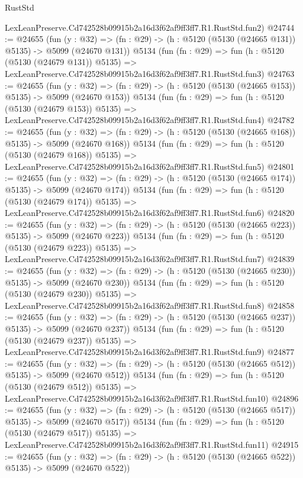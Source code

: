 \begin{lexlean}{RustStd}
\begin{coremodule}
    LexLeanPreserve.Cd742528b09915b2a16d3f62af9ff3ff7.R1.RustStd.fun2)
@24744 := @24655
    (fun (y : @32) => (fn : @29) -> (h : @5120 (@5130 (@24665 @131)) @5135) -> @5099 (@24670 @131))
    @5134
    (fun (fn : @29) =>
    fun (h : @5120 (@5130 (@24679 @131)) @5135) =>
    LexLeanPreserve.Cd742528b09915b2a16d3f62af9ff3ff7.R1.RustStd.fun3)
@24763 := @24655
    (fun (y : @32) => (fn : @29) -> (h : @5120 (@5130 (@24665 @153)) @5135) -> @5099 (@24670 @153))
    @5134
    (fun (fn : @29) =>
    fun (h : @5120 (@5130 (@24679 @153)) @5135) =>
    LexLeanPreserve.Cd742528b09915b2a16d3f62af9ff3ff7.R1.RustStd.fun4)
@24782 := @24655
    (fun (y : @32) => (fn : @29) -> (h : @5120 (@5130 (@24665 @168)) @5135) -> @5099 (@24670 @168))
    @5134
    (fun (fn : @29) =>
    fun (h : @5120 (@5130 (@24679 @168)) @5135) =>
    LexLeanPreserve.Cd742528b09915b2a16d3f62af9ff3ff7.R1.RustStd.fun5)
@24801 := @24655
    (fun (y : @32) => (fn : @29) -> (h : @5120 (@5130 (@24665 @174)) @5135) -> @5099 (@24670 @174))
    @5134
    (fun (fn : @29) =>
    fun (h : @5120 (@5130 (@24679 @174)) @5135) =>
    LexLeanPreserve.Cd742528b09915b2a16d3f62af9ff3ff7.R1.RustStd.fun6)
@24820 := @24655
    (fun (y : @32) => (fn : @29) -> (h : @5120 (@5130 (@24665 @223)) @5135) -> @5099 (@24670 @223))
    @5134
    (fun (fn : @29) =>
    fun (h : @5120 (@5130 (@24679 @223)) @5135) =>
    LexLeanPreserve.Cd742528b09915b2a16d3f62af9ff3ff7.R1.RustStd.fun7)
@24839 := @24655
    (fun (y : @32) => (fn : @29) -> (h : @5120 (@5130 (@24665 @230)) @5135) -> @5099 (@24670 @230))
    @5134
    (fun (fn : @29) =>
    fun (h : @5120 (@5130 (@24679 @230)) @5135) =>
    LexLeanPreserve.Cd742528b09915b2a16d3f62af9ff3ff7.R1.RustStd.fun8)
@24858 := @24655
    (fun (y : @32) => (fn : @29) -> (h : @5120 (@5130 (@24665 @237)) @5135) -> @5099 (@24670 @237))
    @5134
    (fun (fn : @29) =>
    fun (h : @5120 (@5130 (@24679 @237)) @5135) =>
    LexLeanPreserve.Cd742528b09915b2a16d3f62af9ff3ff7.R1.RustStd.fun9)
@24877 := @24655
    (fun (y : @32) => (fn : @29) -> (h : @5120 (@5130 (@24665 @512)) @5135) -> @5099 (@24670 @512))
    @5134
    (fun (fn : @29) =>
    fun (h : @5120 (@5130 (@24679 @512)) @5135) =>
    LexLeanPreserve.Cd742528b09915b2a16d3f62af9ff3ff7.R1.RustStd.fun10)
@24896 := @24655
    (fun (y : @32) => (fn : @29) -> (h : @5120 (@5130 (@24665 @517)) @5135) -> @5099 (@24670 @517))
    @5134
    (fun (fn : @29) =>
    fun (h : @5120 (@5130 (@24679 @517)) @5135) =>
    LexLeanPreserve.Cd742528b09915b2a16d3f62af9ff3ff7.R1.RustStd.fun11)
@24915 := @24655
    (fun (y : @32) => (fn : @29) -> (h : @5120 (@5130 (@24665 @522)) @5135) -> @5099 (@24670 @522))

\end{coremodule}
\end{lexlean}
